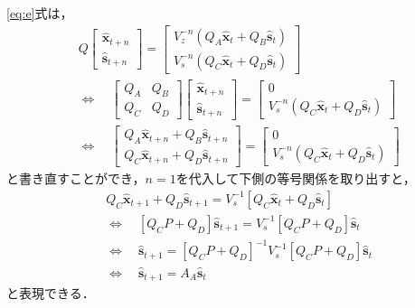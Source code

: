 \documentclass[dvipdfmx]{jlreq}
\begin{document}
\eqref{eq:e}式は，
\begin{equation}
  \begin{split}
    &Q
    \begin{bmatrix}
      \hat{\boldsymbol{x}}_{t+n} \\
      \hat{\boldsymbol{s}}_{t+n}
    \end{bmatrix}
    =
    \begin{bmatrix}
      V_z^{-n}(Q_A\hat{\boldsymbol{x}}_t+Q_B\hat{\boldsymbol{s}}_t) \\
      V_s^{-n}(Q_C\hat{\boldsymbol{x}}_t+Q_D\hat{\boldsymbol{s}}_t)
    \end{bmatrix}
    \\
    &\Leftrightarrow\quad
    \begin{bmatrix}
      Q_A & Q_B \\
      Q_C & Q_D
    \end{bmatrix}
    \begin{bmatrix}
      \hat{\boldsymbol{x}}_{t+n} \\
      \hat{\boldsymbol{s}}_{t+n}
    \end{bmatrix}
    =
    \begin{bmatrix}
      0 \\
      V_s^{-n}(Q_C\hat{\boldsymbol{x}}_t+Q_D\hat{\boldsymbol{s}}_t)
    \end{bmatrix}
    \\
    &\Leftrightarrow\quad
    \begin{bmatrix}
      Q_A\hat{\boldsymbol{x}}_{t+n}
      +Q_B\hat{\boldsymbol{s}}_{t+n}
      \\
      Q_C\hat{\boldsymbol{x}}_{t+n}
      +Q_D\hat{\boldsymbol{s}}_{t+n}
    \end{bmatrix}
    =
    \begin{bmatrix}
      0 \\
      V_s^{-n}(Q_C\hat{\boldsymbol{x}}_t+Q_D\hat{\boldsymbol{s}}_t)
    \end{bmatrix}
  \end{split}
\end{equation}
と書き直すことができ，$n=1$を代入して下側の等号関係を取り出すと，
\begin{equation}
  \begin{split}
    &Q_C\hat{\boldsymbol{x}}_{t+1}
    +Q_D\hat{\boldsymbol{s}}_{t+1}
    =
    V_s^{-1}
    \left[
    Q_C\hat{\boldsymbol{x}}_t
    +
    Q_D\hat{\boldsymbol{s}}_t
    \right]
    \\
    &\Leftrightarrow\quad
    \left[
    Q_CP+Q_D
    \right]
    \hat{\boldsymbol{s}}_{t+1}
    =
    V_s^{-1}
    \left[
    Q_CP+Q_D
    \right]
    \hat{\boldsymbol{s}}_t
    \\
    &\Leftrightarrow\quad
    \hat{\boldsymbol{s}}_{t+1}
    =
    \left[
    Q_CP+Q_D
    \right]^{-1}
    V_s^{-1}
    \left[
    Q_CP+Q_D
    \right]
    \hat{\boldsymbol{s}}_t
    \\
    &\Leftrightarrow\quad
    \hat{\boldsymbol{s}}_{t+1}
    =
    A_A\hat{\boldsymbol{s}}_t
  \end{split}
\end{equation}
と表現できる．
\end{document}
